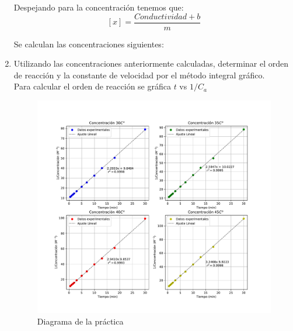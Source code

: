 \begin{enumerate}


    Despejando para la concentración tenemos que:
            $$ [x]= \dfrac{Conductividad + b}{m}$$
            
    Se calculan las concentraciones siguientes:\\



    \item Utilizando las concentraciones anteriormente calculadas, determinar el orden de
    reacción y la constante de velocidad por el método integral gráfico.\\
    Para calcular el orden de reacción se gráfica $t$ vs $1/C_a$\\



    \begin{figure}[H]
        \centering
        \includegraphics[scale=0.65]{Figuras/Ctodos.pdf}
        \caption{Diagrama de la pr\'{a}ctica}
    \end{figure}


\end{enumerate}
